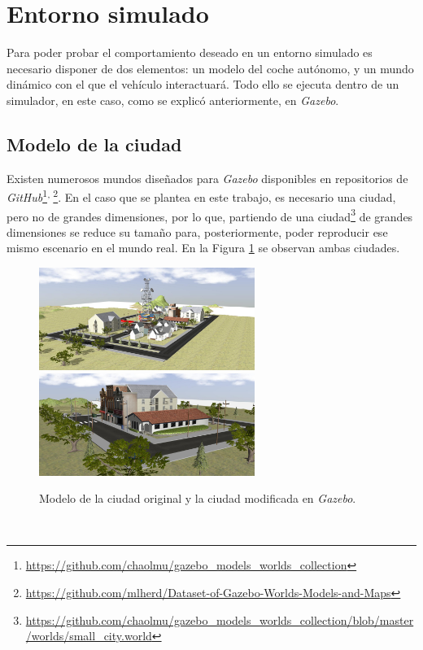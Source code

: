 \section{Entorno simulado}
\label{section:simulation}
Para poder probar el comportamiento deseado en un entorno simulado es necesario disponer de dos elementos: un modelo del coche autónomo, y un mundo dinámico con el que el vehículo interactuará. Todo ello se ejecuta dentro de un simulador, en este caso, como se explicó anteriormente, en \textit{Gazebo}.\\

\subsection{Modelo de la ciudad}
\label{subsection:citymodel}
Existen numerosos mundos diseñados para \textit{Gazebo} disponibles en repositorios de \textit{GitHub}\footnote{\url{https://github.com/chaolmu/gazebo_models_worlds_collection}}$^{,\thinspace}$\footnote{\url{https://github.com/mlherd/Dataset-of-Gazebo-Worlds-Models-and-Maps}}. En el caso que se plantea en este trabajo, es necesario una ciudad, pero no de grandes dimensiones, por lo que, partiendo de una ciudad\footnote{\url{https://github.com/chaolmu/gazebo_models_worlds_collection/blob/master/worlds/small_city.world}} de grandes dimensiones se reduce su tamaño para, posteriormente, poder reproducir ese mismo escenario en el mundo real. En la Figura \ref{fig:cityversus} se observan ambas ciudades.\\

\begin{figure} [h!]
	\begin{center}
		\includegraphics[width=7cm]{figs/city2}\hspace{1cm}\includegraphics[width=7cm]{figs/smallcity}
	\end{center}
	\caption{Modelo de la ciudad original y la ciudad modificada en \textit{Gazebo}.}
	\label{fig:cityversus}
\end{figure}\

